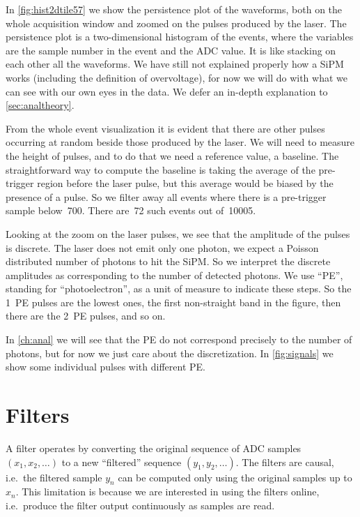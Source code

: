 In \autoref{fig:hist2dtile57} we show the persistence plot of the waveforms,
both on the whole acquisition window and zoomed on the pulses produced by the
laser. The persistence plot is a two-dimensional histogram of the events, where
the variables are the sample number in the event and the ADC value. It is like
stacking on each other all the waveforms. We have still not explained properly
how a SiPM works (including the definition of overvoltage), for now we will do
with what we can see with our own eyes in the data. We defer an in-depth
explanation to \autoref{sec:analtheory}.

From the whole event visualization it is evident that there are other pulses
occurring at random beside those produced by the laser. We will need to measure
the height of pulses, and to do that we need a reference value, a baseline. The
straightforward way to compute the baseline is taking the average of the
pre-trigger region before the laser pulse, but this average would be biased by
the presence of a pulse. So we filter away all events where there is a
pre-trigger sample below~700. There are~72 such events out of~\num{10005}.

Looking at the zoom on the laser pulses, we see that the amplitude of the
pulses is discrete. The laser does not emit only one photon, we expect a
Poisson distributed number of photons to hit the SiPM. So we interpret the
discrete amplitudes as corresponding to the number of detected photons. We use
``PE'', standing for ``photoelectron'', as a unit of measure to indicate these
steps. So the \SI{1}{PE} pulses are the lowest ones, the first non-straight
band in the figure, then there are the \SI{2}{PE} pulses, and so on.

In \autoref{ch:anal} we will see that the PE do not correspond precisely to the
number of photons, but for now we just care about the discretization. In
\autoref{fig:signals} we show some individual pulses with different PE.

\section{Filters}
\label{sec:filters}

A filter operates by converting the original sequence of ADC samples $(x_1,
x_2, \ldots)$ to a new ``filtered'' sequence $(y_1, y_2, \ldots)$. The filters
are causal, i.e.\ the filtered sample $y_n$ can be computed only using the
original samples up to $x_n$. This limitation is because we are interested in
using the filters online, i.e.\ produce the filter output continuously as
samples are read.

